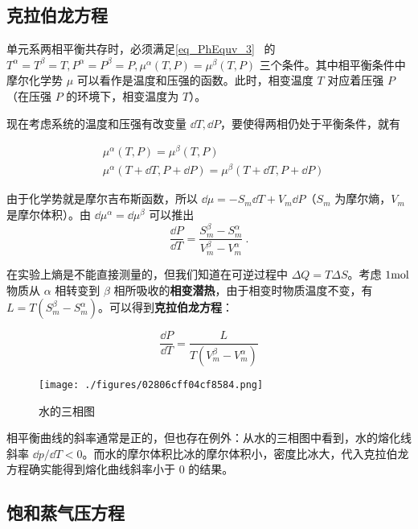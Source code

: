 
\begin{issues}
\issueDraft
\end{issues}


\subsection{克拉伯龙方程}
单元系两相平衡共存时，必须满足\autoref{eq_PhEquv_3}~ 的 $T^\alpha=T^\beta=T,P^\alpha=P^\beta=P,\mu^\alpha(T,P)=\mu^\beta(T,P)$ 三个条件。其中相平衡条件中摩尔化学势 $\mu$ 可以看作是温度和压强的函数。此时，相变温度 $T$ 对应着压强 $P$（在压强 $P$ 的环境下，相变温度为 $T$）。

现在考虑系统的温度和压强有改变量 $\dd T,\dd P$，要使得两相仍处于平衡条件，就有

\begin{align}
&\mu^\alpha(T,P)=\mu^\beta(T,P)\\
&\mu^\alpha(T+\dd T,P+\dd P)=\mu^\beta(T+\dd T,P+\dd P)
\end{align}

由于化学势就是摩尔吉布斯函数，所以 $\dd\mu=-S_m\dd T+V_m\dd P$（$S_m$ 为摩尔熵，$V_m$ 是摩尔体积）。由 $\dd \mu^\alpha=\dd \mu^\beta$ 可以推出
\begin{equation}
\frac{\dd P}{\dd T}=\frac{S^\beta_m-S^\alpha_m}{V^\beta_m-V^\alpha_m}~.
\end{equation}

在实验上熵是不能直接测量的，但我们知道在可逆过程中 $\Delta Q=T\Delta S$。考虑 $1\rm mol$ 物质从 $\alpha$ 相转变到 $\beta$ 相所吸收的\textbf{相变潜热}，由于相变时物质温度不变，有 $L=T(S_m^\beta-S_m^\alpha)$。可以得到\textbf{克拉伯龙方程}：

\begin{equation}\label{eq_Clapey_1}
\frac{\dd P}{\dd T}=\frac{L}{T(V^\beta_m-V^\alpha_m)}
\end{equation}
\begin{figure}[ht]
\centering
\texttt{[image: ./figures/02806cff04cf8584.png]}
\caption{水的三相图} \label{fig_Clapey_1}
\end{figure}

相平衡曲线的斜率通常是正的，但也存在例外：从水的三相图中看到，水的熔化线斜率 $\dd p/\dd T<0$。而水的摩尔体积比冰的摩尔体积小，密度比冰大，代入克拉伯龙方程确实能得到熔化曲线斜率小于 $0$ 的结果。

\subsection{饱和蒸气压方程}

